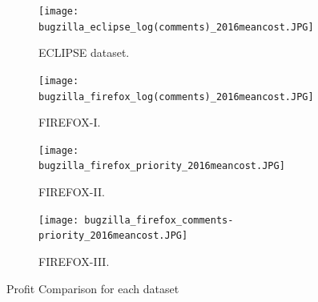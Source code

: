 
\begin{figure}[h]
\begin{subfigure}{\columnwidth}
\texttt{[image: bugzilla\_eclipse\_log(comments)\_2016meancost.JPG]}
\caption{ECLIPSE dataset. }
\end{subfigure}
\begin{subfigure}{\columnwidth}
\texttt{[image: bugzilla\_firefox\_log(comments)\_2016meancost.JPG]}
\caption{FIREFOX-I. }
\end{subfigure}
\begin{subfigure}{\columnwidth}
\texttt{[image: bugzilla\_firefox\_priority\_2016meancost.JPG]}
\caption{FIREFOX-II. }
\end{subfigure}
\begin{subfigure}{\columnwidth}
\texttt{[image: bugzilla\_firefox\_comments-priority\_2016meancost.JPG]}
\caption{FIREFOX-III. }
\end{subfigure}

\caption{Profit Comparison for each dataset}
\label{fig:DatasetProfit}
\end{figure}



